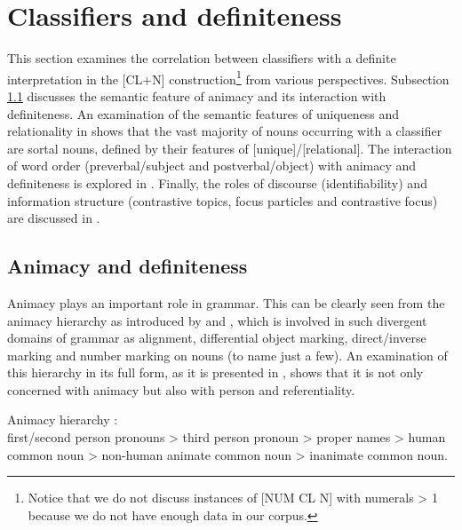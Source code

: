 \documentclass[output=paper]{langsci/langscibook}
\begin{document}
\section{Classifiers and definiteness}\label{1sec:3}

This section examines the correlation between classifiers with a definite interpretation in the [CL+N] construction\footnote{Notice that we do not discuss instances of [NUM CL N] with numerals > 1 because we do not have enough data in our corpus.} from various perspectives. Subsection \ref{1sec:31} discusses the semantic feature of animacy and its interaction with definiteness. An examination of the semantic features of uniqueness and relationality in  shows that the vast majority of nouns occurring with a classifier are sortal nouns, defined by their features of [\minus unique]/[\minus relational]. The interaction of word order (preverbal/subject and postverbal/object) with animacy and definiteness is explored in . Finally, the roles of discourse (identifiability) and information structure (contrastive topics, focus particles and contrastive focus) are discussed in .


\subsection{Animacy and definiteness}\label{1sec:31}

Animacy plays an important role in grammar. This can be clearly seen from the animacy hierarchy as introduced by \citet{silverstein:76} and \citet{dixon:79}, which is involved in such divergent domains of grammar as alignment, differential object marking, direct/inverse marking and number marking on nouns (to name just a few). An examination of this hierarchy in its full form, as it is presented in \citet[][130]{croft:03}, shows that it is not only concerned with animacy but also with person and referentiality.

\begin{exe}
\ex Animacy hierarchy \citep[][130]{croft:03}:\\
        first/second person pronouns > third person pronoun > proper names > human common
        noun > non-human animate common noun > inanimate common noun.
\end{exe}
\end{document}
